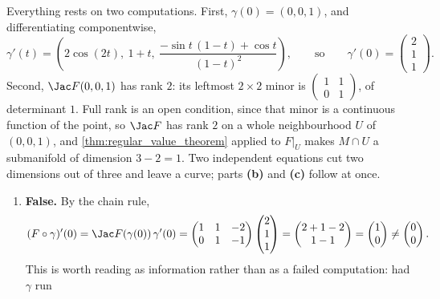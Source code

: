 \begin{exercisesolution}
\label{sol:level_set_of_a_wide_jacobian}
Everything rests on two computations. First, $\gamma(0) = (0,0,1)$, and differentiating
componentwise,
\[\gamma'(t) = \left(2\cos(2t),\ 1+t,\
  \frac{-\sin t\,(1-t) + \cos t}{(1-t)^2}\right), \qquad\text{so}\qquad
  \gamma'(0) = \begin{pmatrix} 2 \\ 1 \\ 1 \end{pmatrix}.\]
Second, $\Jac F(0,0,1)$ has rank $2$: its leftmost $2\times2$ minor is
$\left(\begin{smallmatrix} 1 & 1 \\ 0 & 1\end{smallmatrix}\right)$, of determinant $1$. Full rank
is an open condition, since that minor is a continuous function of the point, so $\Jac F$ has
rank $2$ on a whole neighbourhood $U$ of $(0,0,1)$, and \cref{thm:regular_value_theorem} applied
to $F|_U$ makes $M \cap U$ a submanifold of dimension $3-2 = 1$. Two independent equations cut
two dimensions out of three and leave a curve; parts \textbf{(b)} and \textbf{(c)} follow at
once.
\begin{enumerate}[label=\textbf{(\alph*)}]
  \item \textbf{False.} By the chain rule,
    \[(F\circ\gamma)'(0) = \Jac F(\gamma(0))\,\gamma'(0)
      = \begin{pmatrix} 1 & 1 & -2 \\ 0 & 1 & -1\end{pmatrix}
        \begin{pmatrix} 2 \\ 1 \\ 1 \end{pmatrix}
      = \begin{pmatrix} 2+1-2 \\ 1-1 \end{pmatrix}
      = \begin{pmatrix} 1 \\ 0 \end{pmatrix} \neq \begin{pmatrix} 0 \\ 0\end{pmatrix}.\]
    This is worth reading as information rather than as a failed computation: had $\gamma$ run

\end{enumerate}
\end{exercisesolution}
